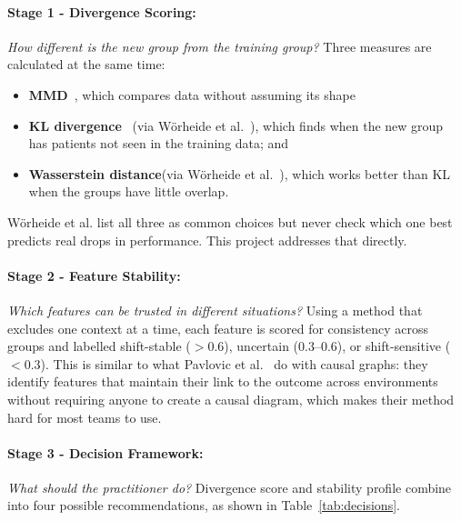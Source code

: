 \paragraph{Stage 1 - Divergence Scoring:}
\textit{How different is the new group from the training group?} Three measures are calculated at the same time: 
\begin{itemize}
    \item \textbf{MMD}~\cite{gretton2012kernel}, which compares data without assuming its shape
    \item \textbf{KL divergence}~\cite{duchi2018learning} (via W\"{o}rheide et al.~\cite{worheide2021shift}), which finds when the new group has patients not seen in the training data; and
    \item \textbf{Wasserstein distance}(via Wörheide et al.~\cite{worheide2021shift}), which works better than KL when the groups have little overlap.
\end{itemize}
W\"{o}rheide et al. list all three as common choices but never check which one best predicts real drops in performance. This project addresses that directly.

\paragraph{Stage 2 - Feature Stability:}
\textit{Which features can be trusted in different situations?} Using a method that excludes one context at a time, each feature is scored for consistency across groups and labelled shift-stable ($>0.6$), uncertain ($0.3$--$0.6$), or shift-sensitive ($<0.3$). This is similar to what Pavlovic et al.~\cite{pavlovic2024causal} do with causal graphs: they identify features that maintain their link to the outcome across environments without requiring anyone to create a causal diagram, which makes their method hard for most teams to use.

\paragraph{Stage 3 - Decision Framework:}
\textit{What should the practitioner do?} Divergence score and stability profile combine into four possible recommendations, as shown in Table~\ref{tab:decisions}.

